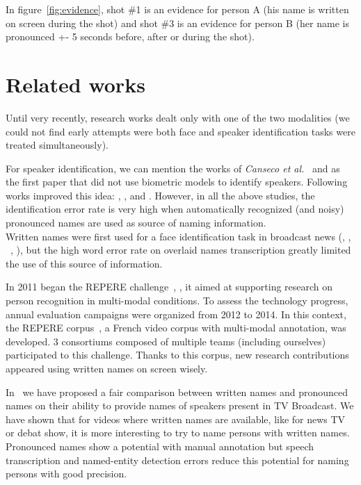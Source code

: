 \documentclass{acm_proc_article-me}
\begin{document}
In figure~\ref{fig:evidence}, shot \#1 is an evidence for person A (his name is written on screen during the shot) and shot \#3 is an evidence for person B (her name is pronounced +- 5 seconds before, after or during the shot).

\section{Related works}

Until very recently, research works dealt only with one of the two modalities (we could not find early attempts were both face and speaker identification tasks were treated simultaneously). 

For speaker identification, we can mention the works of \textit{Canseco et al.}~\cite{CANSECO--INTERSPEECH--2004} and \cite{CANSECO--ASRU--2005} as the first paper that did not use biometric models to identify speakers. Following works improved this idea: \cite{TRANTER--ICASSP--2006}, \cite{MAUCLAIR--Odyssey--2006}, \cite{ESTEVE--INTERSPEECH--2007} and \cite{JOUSSE--ICCASP--2009}. However, in all the above studies, the identification error rate is very high when automatically recognized (and noisy) pronounced names are used as source of naming information. \\

Written names were first used for a face identification task in broadcast news (\cite{SATOH--IEEEMM--1999}, \cite{HOUGHTON--IS--1999}, ~\cite{YANG--ACMMM--2004}, \cite{YANG--ACMMM--2005}), but the high word error rate on overlaid names transcription greatly limited the use of this source of information.

In 2011 began the REPERE challenge~\cite{KAHN--CBMI--2012}, \cite{BERNARD--SLAM--2013}, it aimed at supporting research on person recognition in multi-modal conditions. To assess the technology progress, annual evaluation campaigns were organized from 2012 to 2014. In this context, the REPERE corpus~\cite{GIRAUDEL--LREC--2012}, a French video corpus with multi-modal annotation, was developed. 3 consortiums composed of multiple teams (including ourselves) participated to this challenge. Thanks to this corpus, new research contributions appeared using written names on screen wisely. 

In~\cite{POIGNANT--INTERSPEECH--2013} we have proposed a fair comparison between written names and pronounced names on their ability to provide names of speakers present in TV Broadcast. We have shown that for videos where written names are available, like for news TV or debat show, it is more interesting to try to name persons with written names. Pronounced names show a potential with manual annotation but speech transcription and named-entity detection errors reduce this potential for naming persons with good precision.
\end{document}
